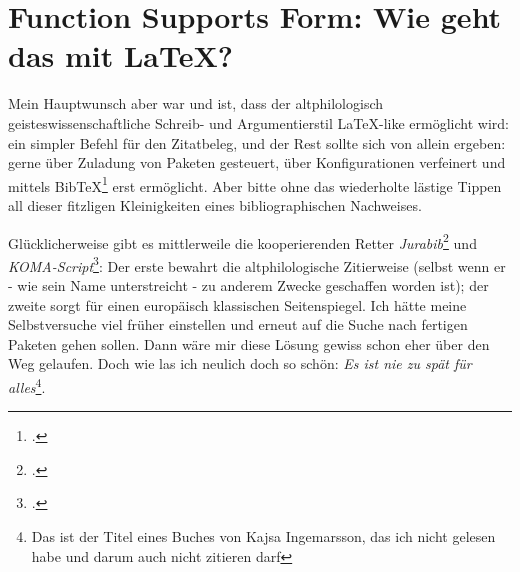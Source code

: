 %
%
%
%
%


\section{Function Supports Form: Wie geht das mit LaTeX?}

Mein Hauptwunsch aber war und ist, dass der altphilologisch
geisteswissenschaftliche Schreib- und Argumentierstil LaTeX-like ermöglicht
wird: ein simpler Befehl für den Zitatbeleg, und der Rest sollte sich von allein
ergeben: gerne über Zuladung von Paketen gesteuert, über Konfigurationen
verfeinert und mittels BibTeX\footcite[vgl.][]{BibtexOrgDe} erst ermöglicht.
Aber bitte ohne das wiederholte lästige Tippen all dieser fitzligen
Kleinigkeiten eines bibliographischen Nachweises.

Glücklicherweise gibt es mittlerweile die kooperierenden Retter
\emph{Jurabib}\footcite[vgl.][]{Berger2004a} und
\emph{KOMA-Script}\footcite[vgl.][]{Kohm2008a}: Der erste bewahrt die
altphilologische Zitierweise (selbst wenn er - wie sein Name unterstreicht - zu
anderem Zwecke geschaffen worden ist); der zweite sorgt für einen europäisch
klassischen Seitenspiegel. Ich hätte meine Selbstversuche viel früher einstellen
und erneut auf die Suche nach fertigen Paketen gehen sollen. Dann wäre mir diese
Lösung gewiss schon eher über den Weg gelaufen. Doch wie las ich neulich doch so
schön: \emph{Es ist nie zu spät für alles}\footnote{Das ist der Titel eines
Buches von Kajsa Ingemarsson, das ich nicht gelesen habe und darum auch nicht
zitieren darf}.

